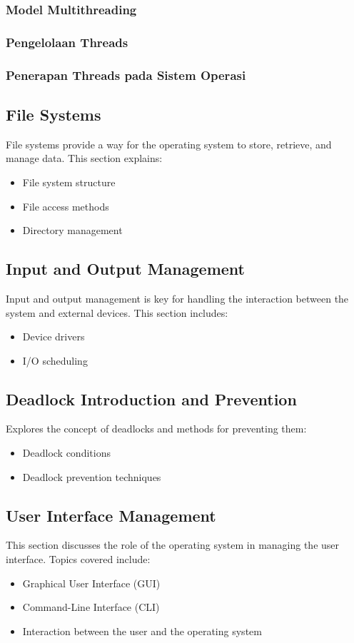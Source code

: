\documentclass[12pt]{article}
\begin{document}
\subsubsection{Model Multithreading}
\subsubsection{Pengelolaan Threads}
\subsubsection{Penerapan Threads pada Sistem Operasi}


\subsection{File Systems}
File systems provide a way for the operating system to store, retrieve, and manage data. This section explains:
\begin{itemize}
    \item File system structure
    \item File access methods
    \item Directory management
\end{itemize}

\subsection{Input and Output Management}
Input and output management is key for handling the interaction between the system and external devices. This section includes:
\begin{itemize}
    \item Device drivers
    \item I/O scheduling
\end{itemize}

\subsection{Deadlock Introduction and Prevention}
Explores the concept of deadlocks and methods for preventing them:
\begin{itemize}
    \item Deadlock conditions
    \item Deadlock prevention techniques
\end{itemize}

\subsection{User Interface Management}
This section discusses the role of the operating system in managing the user interface. Topics covered include:
\begin{itemize}
    \item Graphical User Interface (GUI)
    \item Command-Line Interface (CLI)
    \item Interaction between the user and the operating system
\end{itemize}
\end{document}
